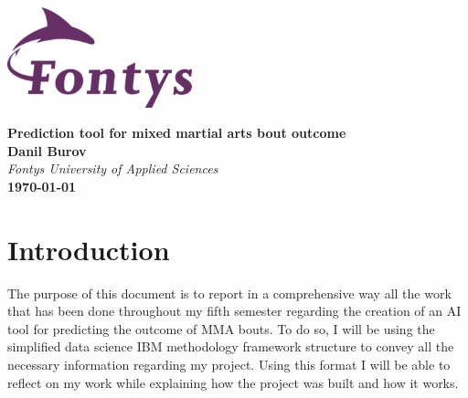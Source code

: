 \documentclass{article}
\begin{document}
	
	\begin{titlepage}
		\centering
		\vspace*{3cm}
		
		\includegraphics[width=0.4\textwidth]{images/fontyslogo.png}
		\vspace{1.5cm}
		
		{\Huge\bfseries Prediction tool for mixed martial arts bout outcome}\\[1cm]
		
		\textbf{Danil Burov}\\
		\vspace{0.5cm}
		\textit{Fontys University of Applied Sciences}\\[3cm]
		\vfill
		\textbf{\today}
		
	\end{titlepage}
	\newpage
	\tableofcontents
	\newpage
\section{Introduction}
	The purpose of this document is to report in a comprehensive way all the work that has been done throughout my fifth semester regarding the creation of an AI tool for predicting the outcome of MMA bouts. To do so, I will be using the simplified data science IBM methodology framework structure to convey all the necessary information regarding my project. Using this format I will be able to reflect on my work while explaining how the project was built and how it works.\\\\
\end{document}
